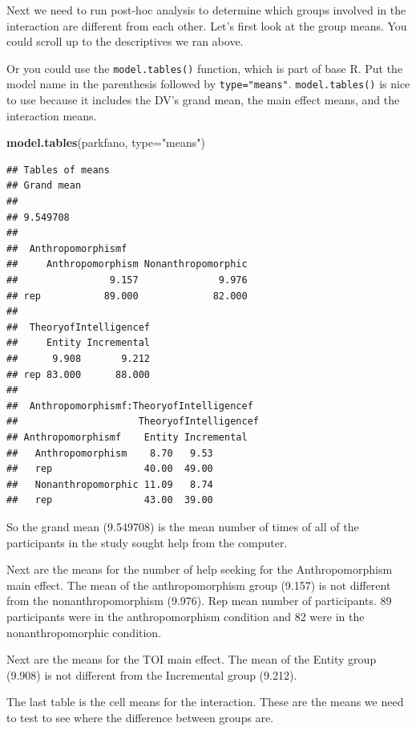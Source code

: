 \documentclass[
]{book}
\newenvironment{Shaded}{\begin{snugshade}}{\end{snugshade}}
\newcommand{\DataTypeTok}[1]{\textcolor[rgb]{0.13,0.29,0.53}{#1}}
\newcommand{\KeywordTok}[1]{\textcolor[rgb]{0.13,0.29,0.53}{\textbf{#1}}}
\newcommand{\NormalTok}[1]{#1}
\newcommand{\StringTok}[1]{\textcolor[rgb]{0.31,0.60,0.02}{#1}}
\begin{document}
Next we need to run post-hoc analysis to determine which groups involved in the interaction are different from each other. Let's first look at the group means. You could scroll up to the descriptives we ran above.

Or you could use the \texttt{model.tables()} function, which is part of base R. Put the model name in the parenthesis followed by \texttt{type="means"}. \texttt{model.tables()} is nice to use because it includes the DV's grand mean, the main effect means, and the interaction means.

\begin{Shaded}
\begin{Highlighting}[]
\KeywordTok{model.tables}\NormalTok{(parkfano, }\DataTypeTok{type=}\StringTok{"means"}\NormalTok{)}
\end{Highlighting}
\end{Shaded}

\begin{verbatim}
## Tables of means
## Grand mean
##          
## 9.549708 
## 
##  Anthropomorphismf 
##     Anthropomorphism Nonanthropomorphic
##                9.157              9.976
## rep           89.000             82.000
## 
##  TheoryofIntelligencef 
##     Entity Incremental
##      9.908       9.212
## rep 83.000      88.000
## 
##  Anthropomorphismf:TheoryofIntelligencef 
##                     TheoryofIntelligencef
## Anthropomorphismf    Entity Incremental
##   Anthropomorphism    8.70   9.53      
##   rep                40.00  49.00      
##   Nonanthropomorphic 11.09   8.74      
##   rep                43.00  39.00
\end{verbatim}

So the grand mean (9.549708) is the mean number of times of all of the participants in the study sought help from the computer.

Next are the means for the number of help seeking for the Anthropomorphism main effect. The mean of the anthropomorphism group (9.157) is not different from the nonanthropomorphism (9.976). Rep mean number of participants. 89 participants were in the anthropomorphism condition and 82 were in the nonanthropomorphic condition.

Next are the means for the TOI main effect. The mean of the Entity group (9.908) is not different from the Incremental group (9.212).

The last table is the cell means for the interaction. These are the means we need to test to see where the difference between groups are.
\end{document}
